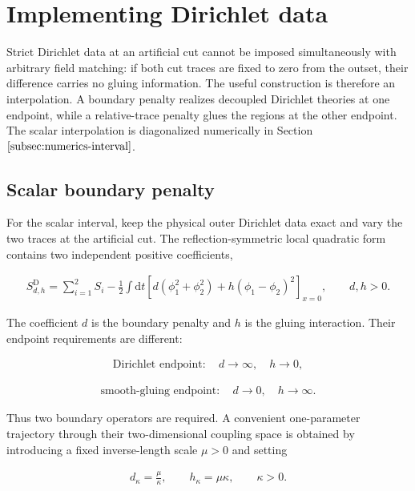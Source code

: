 \section{Implementing Dirichlet data}\label{app:dirichlet}

Strict Dirichlet data at an artificial cut cannot be imposed simultaneously with arbitrary field matching: if both cut traces are fixed to zero from the outset, their difference carries no gluing information. The useful construction is therefore an interpolation. A boundary penalty realizes decoupled Dirichlet theories at one endpoint, while a relative-trace penalty glues the regions at the other endpoint. The scalar interpolation is diagonalized numerically in Section $\ref{subsec:numerics-interval}$.

\subsection{Scalar boundary penalty}\label{subsec:dirichlet-scalar}

For the scalar interval, keep the physical outer Dirichlet data exact and vary the two traces at the artificial cut. The reflection-symmetric local quadratic form contains two independent positive coefficients,

\begin{align}
S_{d,h}^{\mathrm D}
=\sum_{i=1}^2S_i
-\frac12\int\mathrm dt\left[
d(\phi_1^2+\phi_2^2)
+h(\phi_1-\phi_2)^2
\right]_{x=0},
\qquad d,h>0.
\end{align}

The coefficient $d$ is the boundary penalty and $h$ is the gluing interaction. Their endpoint requirements are different:

\begin{align}
\text{Dirichlet endpoint}:\quad d\to\infty,\quad h\to0,
\end{align}

\begin{align}
\text{smooth-gluing endpoint}:\quad d\to0,\quad h\to\infty.
\end{align}

Thus two boundary operators are required. A convenient one-parameter trajectory through their two-dimensional coupling space is obtained by introducing a fixed inverse-length scale $\mu>0$ and setting

\begin{align}
d_\kappa=\frac\mu\kappa,
\qquad
h_\kappa=\mu\kappa,
\qquad \kappa>0.
\end{align}

